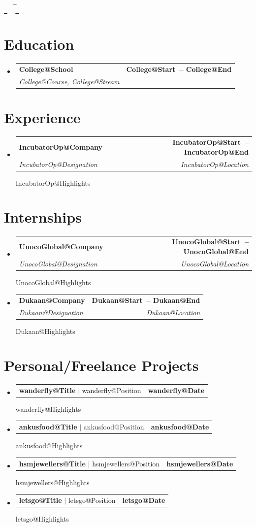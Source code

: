 \documentclass[letterpaper,11pt]{article}
\makeatletter
\newcommand{\resumeSubheading}[4]{
  \vspace{-2pt}\item
    \begin{tabular*}{1.0\textwidth}[t]{l@{\extracolsep{\fill}}r}
      \textbf{#1} & \textbf{\small #2} \\
      \textit{\small#3} & \textit{\small #4} \\
    \end{tabular*}\vspace{-7pt}
}
\newcommand{\resumeProjectHeading}[2]{
    \item
    \begin{tabular*}{1.001\textwidth}{l@{\extracolsep{\fill}}r}
      \small#1 & \textbf{\small #2}\\
    \end{tabular*}\vspace{-7pt}
}
\newcommand{\resumeSubHeadingListStart}{\begin{itemize}[leftmargin=0.0in, label={}]}
\newcommand{\resumeSubHeadingListEnd}{\end{itemize}}
\def\titlesection{
\begin{center}
    {\Huge \scshape \firstname \ \lastname} \\ \vspace{1pt}
    \small \raisebox{-0.1\height}\faPhone\ \jasphone ~ \href{mailto:\email}{\raisebox{-0.2\height}\faEnvelope\  \underline{\email}} \\
    \href{\linkedin}{\raisebox{-0.2\height}\faLinkedin\ \underline{\linkedin}}  ~
    \href{\github}{\raisebox{-0.2\height}\faGithub\ \underline{\github}}
    \vspace{-8pt}
\end{center}
}
\makeatother
\begin{document}
\titlesection
\profileSummary


\section{Education}
  \resumeSubHeadingListStart
      \resumeSubheading{\csname College@School\endcsname}
      {\csname College@Start\endcsname \ -- \csname College@End\endcsname}
      {\csname College@Course\endcsname, \csname College@Stream\endcsname}{}
  \resumeSubHeadingListEnd


\newcommand{\renderExp}[1]{
\resumeSubheading
      {\csname #1@Company\endcsname}{\csname #1@Start\endcsname \ -- \csname #1@End\endcsname}
      {\csname #1@Designation\endcsname}{\csname #1@Location\endcsname}
      \csname #1@Highlights\endcsname
}

\section{Experience}
    \resumeSubHeadingListStart
        \renderExp{IncubatorOp}
  \resumeSubHeadingListEnd

\section{Internships}
\resumeSubHeadingListStart
    \renderExp{UnocoGlobal}
    \renderExp{Dukaan}
\resumeSubHeadingListEnd

\newcommand{\renderHck}[1]{
      \resumeProjectHeading
      {\textbf{\csname #1@Title\endcsname} $|$ \csname #1@Position\endcsname}
      {\csname #1@Date\endcsname}
      \csname #1@Highlights\endcsname
}

\section{Personal/Freelance Projects}
\vspace{-5pt}
\resumeSubHeadingListStart
    \renderHck{wanderfly}
    \vspace{-13pt}
    \renderHck{ankusfood}
    \vspace{-13pt}
    \renderHck{hsmjewellers}
    \vspace{-13pt}
    \renderHck{letsgo}
    \vspace{-13pt}
\resumeSubHeadingListEnd
\end{document}
